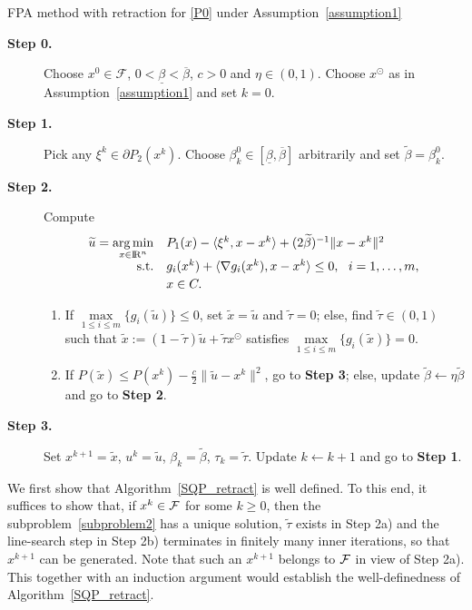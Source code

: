 \documentclass[10pt]{article}
\numberwithin{equation}{section}
\def\R{{\rm I\!R}}
\def\argmin{\mathop{\rm arg\,min}}
\def\xfeas{x^\odot}
\begin{document}
\begin{algorithm}
\caption{FPA method with retraction for \eqref{P0} under Assumption~\ref{assumption1}}\label{SQP_retract}
\begin{algorithmic}
\STATE
\begin{description}
  \item[\bf Step 0.] Choose $x^0\in \mathcal{F}$, $0 < \underline{\beta} < \overline{\beta}$, $c > 0$ and $\eta \in (0, 1)$. Choose $\xfeas$ as in Assumption~\ref{assumption1} and set $k = 0$.
  \item[\bf Step 1.] Pick any $\xi^k\in \partial P_2(x^k)$. Choose $\beta_k^0\in[\underline{\beta}, \overline{\beta}]$ arbitrarily and set $\widetilde{\beta} = \beta_k^0$.
  \item[\bf Step 2.] Compute
  \begin{equation}\label{subproblem2}
  \begin{array}{rl}
  \widetilde{u}= \argmin\limits_{x\in\R^n} & P_1(x) - \langle \xi^k, x - x^k\rangle + (2\widetilde{\beta})^{-1}\|x - x^k\|^2\\ [2pt]
      {\rm s.t.}& g_i(x^k) + \langle \nabla g_i(x^k), x - x^k\rangle\leq 0,\ \ i = 1, \ldots, m,\\ [2pt]
      & x\in C.
  \end{array}
  \end{equation}
  \begin{enumerate}[\bf {Step 2}a)]
    \item If $\max\limits_{1 \le i \le m} \{g_i(\widetilde{u})\}\leq 0$, set $\widetilde{x}=\widetilde{u}$ and $\widetilde\tau = 0$; else, find $\widetilde{\tau}\in(0,1)$ such that $\widetilde{x}:=(1 - \widetilde{\tau})\widetilde{u} + \widetilde{\tau} \xfeas$ satisfies $\max\limits_{1 \le i \le m} \{g_i(\widetilde{x})\} = 0$.
    \item If $P(\widetilde{x}) \leq P(x^k) - \frac{c}{2}\|\widetilde{u} - x^k\|^2$, go to \textbf{Step 3}; else, update $\widetilde{\beta}\leftarrow \eta\widetilde{\beta}$ and go to \textbf{Step 2}.
  \end{enumerate}
  \item[\bf Step 3.] Set $x^{k+1} = \widetilde{x}$, $u^k = \widetilde{u}$, $\beta_k = \widetilde{\beta}$, $\tau_k = \widetilde{\tau}$. Update $k \leftarrow k+1$ and go to \textbf{Step 1}.
\end{description}
\end{algorithmic}
\end{algorithm}

We first show that Algorithm~\ref{SQP_retract} is well defined. To this end, it suffices to show that, if $x^k\in {\cal F}$ for some $k\ge 0$, then the subproblem~\eqref{subproblem2} has a unique solution, $\widetilde\tau$ exists in Step 2a) and the line-search step in Step 2b) terminates in finitely many inner iterations, so that $x^{k+1}$ can be generated. Note that such an $x^{k+1}$ belongs to ${\cal F}$ in view of Step 2a). This together with an induction argument would establish the well-definedness of Algorithm~\ref{SQP_retract}.
\end{document}
